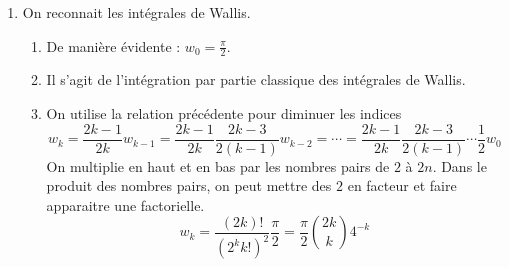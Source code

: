 \begin{enumerate}
\item On reconnait les intégrales de Wallis.
\begin{enumerate}
  \item De manière évidente : $w_0 = \frac{\pi}{2}$.
  \item Il s'agit  de l'intégration par partie classique des intégrales de Wallis.
  \item On utilise la relation précédente pour diminuer les indices
\begin{displaymath}
w_k = \frac{2k-1}{2k} w_{k-1} = \frac{2k-1}{2k} \frac{2k-3}{2(k-1)} w_{k-2}
= \cdots = 
\frac{2k-1}{2k} \frac{2k-3}{2(k-1)} \cdots \frac{1}{2} w_{0}
\end{displaymath}
On multiplie en haut et en bas par les nombres pairs de $2$ à $2n$. Dans le produit des nombres pairs, on peut mettre des $2$ en facteur et faire apparaitre une factorielle.
\begin{displaymath}
w_k =
\frac{(2k)!}{(2^k k!)^2}\frac{\pi}{2}
= \frac{\pi}{2}\binom{2k}{k}4^{-k}
\end{displaymath}
\end{enumerate}
\end{enumerate}


